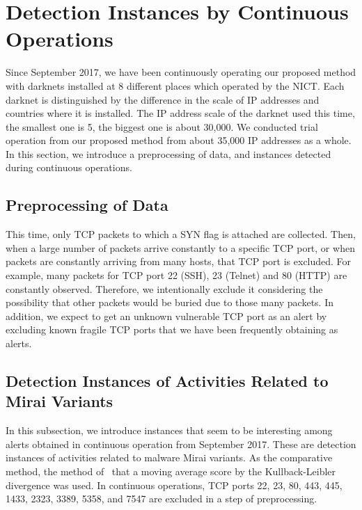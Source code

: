 \documentclass{sig-alternate-10pt}
\begin{document}
\section{Detection Instances by Continuous Operations}
Since September 2017, we have been continuously operating our proposed method with darknets installed at 8 different places which operated by the NICT.
Each darknet is distinguished by the difference in the scale of IP addresses and countries where it is installed.
The IP address scale of the darknet used this time, the smallest one is 5, the biggest one is about 30,000.
We conducted trial operation from our proposed method from about 35,000 IP addresses as a whole.
In this section, we introduce a preprocessing of data, and instances detected during continuous operations.

\subsection{Preprocessing of Data}
This time, only TCP packets to which a SYN flag is attached are collected.
Then, when a large number of packets arrive constantly to a specific TCP port, or when packets are constantly arriving from many hosts, that TCP port is excluded.
For example, many packets for TCP port 22 (SSH), 23 (Telnet) and 80 (HTTP) are constantly observed.
Therefore, we intentionally exclude it considering the possibility that other packets would be buried due to those many packets.
In addition, we expect to get an unknown vulnerable TCP port as an alert by excluding known fragile TCP ports that we have been frequently obtaining as alerts.


\subsection{Detection Instances of Activities Related to Mirai Variants}
In this subsection, we introduce instances that seem to be interesting among alerts obtained in continuous operation from September 2017.
These are detection instances of activities related to malware Mirai variants.
As the comparative method, the method of~\cite{Mukai1} that a moving average score by the Kullback-Leibler divergence was used.
In continuous operations, TCP ports 22, 23, 80, 443, 445, 1433, 2323, 3389, 5358, and 7547 are excluded in a step of preprocessing.
\end{document}
